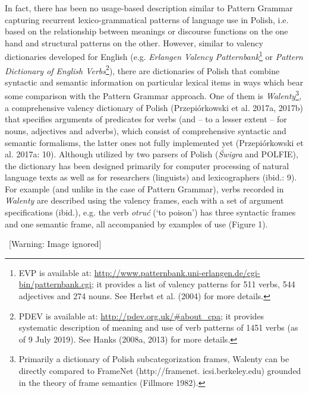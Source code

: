 \documentclass[12pt]{article}
\newenvironment{styleStandard}{\setlength\leftskip{0cm}\setlength\rightskip{0cm plus 1fil}\setlength\parindent{0cm}\setlength\parfillskip{0pt plus 1fil}\setlength\parskip{0in plus 1pt}\writerlistparindent\writerlistleftskip\leavevmode\normalfont\normalsize\writerlistlabel\ignorespaces}{\unskip\vspace{0.111in plus 0.0111in}\par}
\newcommand\writerlistleftskip{}
\newcommand\writerlistparindent{}
\newcommand\writerlistlabel{}
\begin{document}
\begin{styleStandard}
In fact, there has been no usage-based description similar to Pattern Grammar capturing recurrent lexico-grammatical patterns of language use in Polish, i.e. based on the relationship between meanings or discourse functions on the one hand and structural patterns on the other. However, similar to valency dictionaries developed for English (e.g. \textit{Erlangen Valency Patternbank}\footnote{\textrm{EVP is available at: }\url{http://www.patternbank.uni-erlangen.de/cgi-bin/patternbank.cgi}\textrm{; it provides a list of valency patterns for 511 verbs, 544 adjectives and 274 nouns. See Herbst et al. (2004) for more details.}} or \textit{Pattern Dictionary of English Verbs}\footnote{\textrm{PDEV is available at: }\url{http://pdev.org.uk/\#about_cpa}\textrm{; it provides systematic description of meaning and use of verb patterns of 1451 verbs (as of 9 July 2019). See Hanks (2008a, 2013) for more details.}}), there are dictionaries of Polish that combine syntactic and semantic information on particular lexical items in ways which bear some comparison with the Pattern Grammar approach. One of them is \textit{Walenty}\footnote{ Primarily a dictionary of Polish subcategorization frames, Walenty can be directly compared to FrameNet (http://framenet. icsi.berkeley.edu) grounded in the theory of frame semantics (Fillmore 1982).}\textit{,} a comprehensive valency dictionary of Polish (Przepiórkowski et al. 2017a, 2017b) that specifies arguments of predicates for verbs (and – to a lesser extent – for nouns, adjectives and adverbs), which consist of comprehensive syntactic and semantic formalisms, the latter ones not fully implemented yet (Przepiórkowski et al. 2017a: 10). Although utilized by two parsers of Polish (\textit{Świgra} and POLFIE), the dictionary has been designed primarily for computer processing of natural language texts as well as for researchers (linguists) and lexicographers (ibid.: 9). For example (and unlike in the case of Pattern Grammar), verbs recorded in \textit{Walenty} are described using the valency frames, each with a set of argument specifications (ibid.), e.g. the verb \textit{otruć }(‘to poison’) has three syntactic frames and one semantic frame, all accompanied by examples of use (Figure 1).
\end{styleStandard}

\begin{styleStandard}
\   [Warning: Image ignored] %
 
\end{styleStandard}
\end{document}

